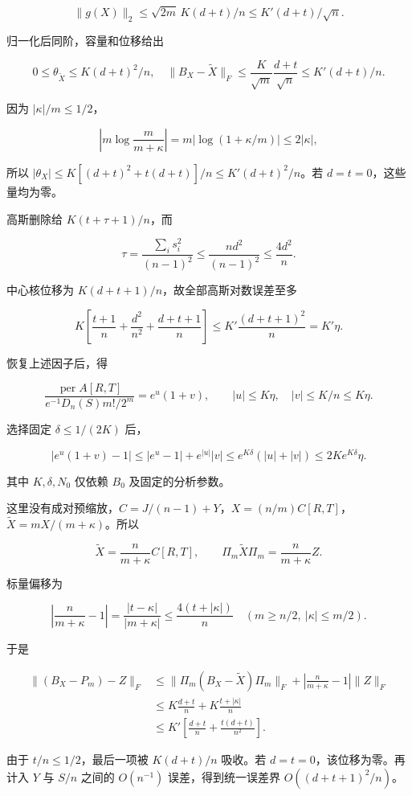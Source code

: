 \documentclass[11pt,a4paper]{article}
\begin{document}
\[
\|g(X)\|_2\le\sqrt{2m}\,K(d+t)/n
\le K'(d+t)/\sqrt n.
\]

归一化后同阶，容量和位移给出

\[
0\le\theta_{\widetilde X}\le K(d+t)^2/n,
\quad
\|B_X-\widetilde X\|_F\le\frac K{\sqrt m}\frac{d+t}{\sqrt n}
\le K'(d+t)/n.
\]

因为 \(|\kappa|/m\le1/2\)，

\[
\left|m\log\frac m{m+\kappa}\right|
=m|\log(1+\kappa/m)|\le2|\kappa|,
\]

所以 \(|\theta_X|\le K[(d+t)^2+t(d+t)]/n\le K'(d+t)^2/n\)。若 \(d=t=0\)，这些量均为零。

高斯删除给 \(K(t+\tau+1)/n\)，而

\[
\tau=\frac{\sum_i s_i^2}{(n-1)^2}\le\frac{nd^2}{(n-1)^2}\le\frac{4d^2}n.
\]

中心核位移为 \(K(d+t+1)/n\)，故全部高斯对数误差至多

\[
K\left[\frac{t+1}n+\frac{d^2}{n^2}+\frac{d+t+1}n\right]
\le K'\frac{(d+t+1)^2}n=K'\eta.
\]

恢复上述因子后，得

\[
\frac{\operatorname{per}A[R,T]}{e^{-1}D_n(S)m!/2^m}
=e^u(1+v),\qquad |u|\le K\eta,\quad |v|\le K/n\le K\eta.
\]

选择固定 \(\delta\le1/(2K)\) 后，

\[
|e^u(1+v)-1|
\le|e^u-1|+e^{|u|}|v|
\le e^{K\delta}(|u|+|v|)
\le2Ke^{K\delta}\eta.
\]

其中 \(K,\delta,N_0\) 仅依赖 \(B_0\) 及固定的分析参数。

这里没有成对预缩放，\(C=J/(n-1)+Y\)，\(X=(n/m)C[R,T]\)，\(\widetilde X=mX/(m+\kappa)\)。所以

\[
\widetilde X=\frac n{m+\kappa}C[R,T],\qquad
\Pi_m\widetilde X\Pi_m=\frac n{m+\kappa}Z.
\]

标量偏移为

\[
\left|\frac n{m+\kappa}-1\right|
=\frac{|t-\kappa|}{|m+\kappa|}
\le\frac{4(t+|\kappa|)}n
\quad(m\ge n/2,\ |\kappa|\le m/2).
\]

于是

\[
\begin{aligned}
\|(B_X-P_m)-Z\|_F
&\le\|\Pi_m(B_X-\widetilde X)\Pi_m\|_F
+\left|\frac n{m+\kappa}-1\right|\|Z\|_F\\
&\le K\frac{d+t}{n}+K\frac{t+|\kappa|}{n}\\
&\le K'\left[\frac{d+t}{n}+\frac{t(d+t)}{n^2}\right].
\end{aligned}
\]

由于 \(t/n\le1/2\)，最后一项被 \(K(d+t)/n\) 吸收。若 \(d=t=0\)，该位移为零。再计入 \(Y\) 与 \(S/n\) 之间的 \(O(n^{-1})\) 误差，得到统一误差界 \(O((d+t+1)^2/n)\)。
\end{document}
